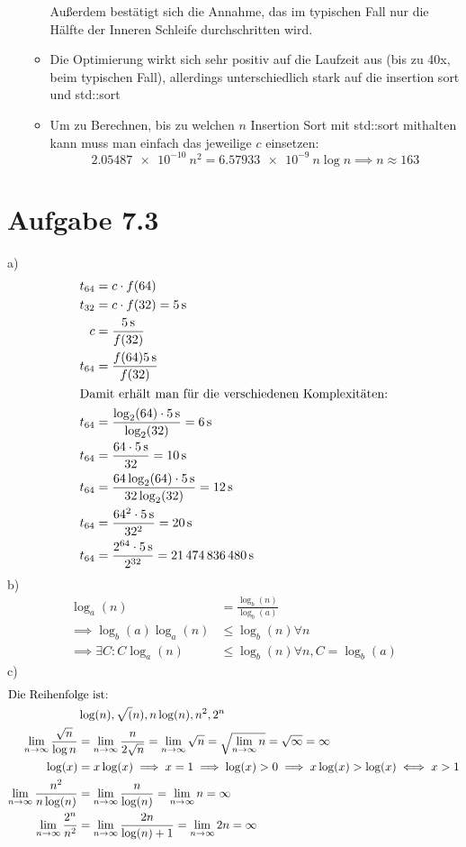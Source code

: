 \documentclass[a4paper]{scrartcl}
\DeclareMathOperator{\Exists}{\exists}%
\DeclareMathOperator{\Forall}{\forall}%
\begin{document}
\begin{itemize}
\begin{itemize}
Außerdem bestätigt sich die Annahme, das im typischen Fall nur die Hälfte der Inneren Schleife durchschritten
wird.
\item Die Optimierung wirkt sich sehr positiv auf die Laufzeit aus (bis zu 40x, beim typischen Fall), allerdings unterschiedlich stark auf die insertion sort und std::sort
\item Um zu Berechnen, bis zu welchen $n$ Insertion Sort mit std::sort mithalten kann muss man einfach das jeweilige $c$ einsetzen:
\[\SI{2.05487e-10}{}n^2 = \SI{6.57933e-9}{}n\log n \implies n \approx 163\]
\end{itemize}
\end{itemize}
\section*{Aufgabe 7.3}
a)
\begin{align*}
t_{64} &= c\cdot f(64) \\
t_{32} &= c\cdot f(32) = \SI{5}{\second} \\
c &= \frac{\SI{5}{\second}}{f(32)} \\
t_{64} &= \frac{f(64) \SI{5}{\second}}{f(32)} \\
\shortintertext{Damit erhält man für die verschiedenen Komplexitäten:}
t_{64} &= \frac{\log_2(64) \cdot\SI{5}{\second}}{\log_2(32)} = \SI{6}{\second} \\
t_{64} &= \frac{64 \cdot \SI{5}{\second}}{32} = \SI{10}{\second} \\
t_{64} &= \frac{64 \log_2(64) \cdot\SI{5}{\second}}{32 \log_2(32)} = \SI{12}{\second} \\
t_{64} &= \frac{64^2 \cdot\SI{5}{\second}}{32^2} = \SI{20}{\second} \\
t_{64} &= \frac{2^{64} \cdot\SI{5}{\second}}{2^{32}} = \SI{21474836480}{\second} \\
\end{align*}
b)
\begin{align*}
\log_a(n) &= \frac{\log_b(n)}{\log_b(a)} \\
\implies \log_b(a) \log_a(n) &\leq \log_b(n) \Forall n \\
\implies \Exists C: C\log_a(n) &\leq \log_b(n) \Forall n, C = \log_b(a)
\end{align*}
c)
\begin{align*}
\intertext{Die Reihenfolge ist:}
&\log(n), \sqrt(n), n\log(n), n^2, 2^n \\
\lim_{n\to\infty} \frac{\sqrt{n}}{\log{n}} &= \lim_{n\to\infty} \frac{n}{2\sqrt{n}} = \lim_{n\to\infty} \sqrt{n} = \sqrt{\lim_{n\to\infty} n} = \sqrt{\infty} = \infty \\
\log(x) &= x \log(x) \implies x = 1 \implies \log(x) > 0 \implies x\log(x) > \log(x) \iff x > 1 \\
\lim_{n\to\infty} \frac{n^2}{n\log(n)} &= \lim_{n\to\infty} \frac{n}{\log(n)} = \lim_{n\to\infty} n = \infty \\
\lim_{n\to\infty} \frac{2^n}{n^2} &= \lim_{n\to\infty} \frac{2n}{\log(n) + 1} = \lim_{n\to\infty} 2n = \infty \\
\end{align*}
\end{document}
